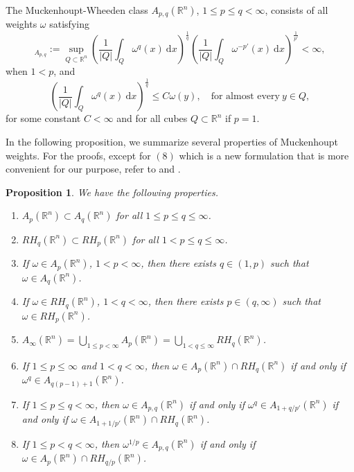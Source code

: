 \documentclass[12pt, letterpaper]{amsart}
\newtheorem{prop}[thm]{Proposition}
\theoremstyle{definition}
\theoremstyle{remark}
\numberwithin{equation}{section}
\begin{document}
The Muckenhoupt-Wheeden class $A_{p,q}(\mathbb{R}^n)$, $1\le p \le q <\infty$, consists of all weights $\omega$ satisfying
\begin{equation*}
    [ \omega  ]_{A_{p,q}}:= \sup_{Q \subset \mathbb{R}^n  } \left ( \frac{1}{|Q|} \int_Q \omega^q(x) \ \mathrm{d}x   \right )^{\frac{1}{q}} \left ( \frac{1}{|Q|} \int_Q \omega^{-p'}(x) \ \mathrm{d}x   \right )^{\frac{1}{p'}} < \infty,
\end{equation*}
when $1<p$, and 
\begin{equation*}
   \left ( \frac{1}{|Q|} \int_Q \omega^q(x) \ \mathrm{d}x   \right )^{\frac{1}{q}} \leq C \omega(y), \quad \text{for almost every} \ y \in Q,
\end{equation*}
for some constant $C <\infty$ and for all cubes $Q \subset \mathbb{R}^n$ if $p=1$.

In the following proposition, we summarize several properties of Muckenhoupt weights. For the proofs, except for $(8)$ which is a new  formulation that is more convenient for our purpose, refer to \cite{garcia2011weighted} and \cite[Chapter 7]{grafakos2008classical}.

\begin{prop}\label{prop:weights} We have the following properties.
    \begin{enumerate}
        \item $A_p(\mathbb{R}^n) \subset A_q(\mathbb{R}^n)$ for all $1 \leq p \leq q \leq \infty$.
        \item $RH_q(\mathbb{R}^n) \subset RH_p(\mathbb{R}^n)$ for all $1 < p \leq q \leq \infty$.
        \item If $\omega \in A_p(\mathbb{R}^n)$, $1<p<\infty$, then there exists $q \in (1,p)$ such that $\omega \in A_q(\mathbb{R}^n)$.
        \item If $\omega \in RH_q(\mathbb{R}^n)$, $1<q<\infty$, then there exists $p \in (q,\infty)$ such that $\omega \in RH_p(\mathbb{R}^n)$.
        \item $A_\infty(\mathbb{R}^n)= \bigcup_{1\le p<\infty} A_p(\mathbb{R}^n)= \bigcup_{1< q\le \infty} RH_q(\mathbb{R}^n) $.
        \item If $1\leq p \leq \infty$ and $1<q<\infty$, then $\omega \in A_p(\mathbb{R}^n) \cap RH_q(\mathbb{R}^n)$ if and only if $\omega^q \in A_{q(p-1)+1}(\mathbb{R}^n)$.
        \item If $1 \le p \le q < \infty$, then $\omega \in A_{p,q}(\mathbb{R}^n)$ if and only if $\omega^q \in A_{1+q/p'}(\mathbb{R}^n)$ if and only if $\omega \in A_{1+1/p'}(\mathbb{R}^n)\cap RH_q(\mathbb{R}^n)$.
        \item If $1 \le  p < q < \infty$, then $\omega^{1/p} \in A_{p,q}(\mathbb{R}^n)$ if and only if 
        $\omega \in A_p(\mathbb{R}^n) \cap RH_{q/p}(\mathbb{R}^n)$.
    \end{enumerate}
\end{prop}
\end{document}
